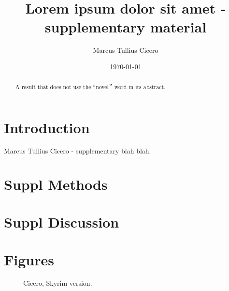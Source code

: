 \documentclass[fleqn]{scrartcl}%
\title{Lorem ipsum dolor sit amet - supplementary material}%
\author{Marcus Tullius Cicero}%
\date{\today}%
\begin{document}
    \maketitle
    \begin{abstract}
        A result that does not use the ``novel\("\) word in its abstract.
    \end{abstract}


    \clearpage
    \section*{Introduction}
    Marcus Tullius Cicero  - supplementary blah blah.

    \clearpage
    \section*{Suppl Methods}
    \blindtext




    \clearpage
    \section*{Suppl Discussion}
    \blindtext


    \clearpage
    


    \clearpage
    \section*{Figures}

    \begin{figure}[ht]%
        \caption {Cicero, Skyrim version.}
        \label{fig:ciceroskyrim} %
    \end{figure}
\end{document}
